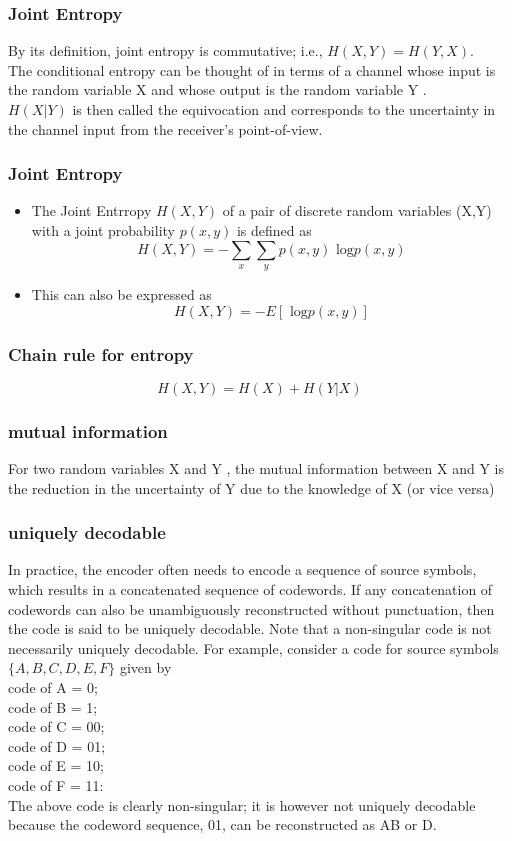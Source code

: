 \documentclass[a4]{beamer}
\begin{document}
\begin{frame}

\frametitle{Joint Entropy}
By its definition, joint entropy is commutative; i.e., $H(X,Y ) = H(Y,X)$.
\\
The conditional entropy can be thought of in terms of a channel whose input
is the random variable X and whose output is the random variable Y . \\

$H(X|Y )$ is
then called the equivocation and corresponds to the uncertainty in the channel
input from the receiver's point-of-view.
\end{frame}
\begin{frame}

\frametitle{Joint Entropy}
\begin{itemize}
	\item The Joint Entrropy $H(X,Y)$ of a pair of discrete random variables (X,Y) with a joint probability $p(x,y)$ is defined as
	\[ H(X,Y) = -\sum_x \sum_y p(x,y) \mbox{ log}p(x,y)\]
	\item This can also be expressed as 
	\[ H(X,Y) = - E[\mbox{ log}p(x,y)]\]
\end{itemize}
\end{frame}
\begin{frame}
\frametitle{Chain rule for entropy}
\[H(X, Y ) = H(X) + H(Y |X)\]
\end{frame}


\begin{frame}
\frametitle{mutual information}
For two random variables X and Y , the mutual information between X and
Y is the reduction in the uncertainty of Y due to the knowledge of X (or vice
versa)
\end{frame}

\begin{frame}
\frametitle{uniquely decodable}
In practice, the encoder often needs to encode a sequence of source symbols,
which results in a concatenated sequence of codewords. If any concatenation of
codewords can also be unambiguously reconstructed without punctuation, then
the code is said to be uniquely decodable. Note that a non-singular code is not
necessarily uniquely decodable. For example, consider a code for source symbols
$\{A,B,C,D,E, F \}$ given by\\
code of A = 0;\\
code of B = 1;\\
code of C = 00;\\
code of D = 01;\\
code of E = 10;\\
code of F = 11:\\
The above code is clearly non-singular; it is however not uniquely decodable
because the codeword sequence, 01, can be reconstructed as AB or D.
\end{frame}
\end{document}
